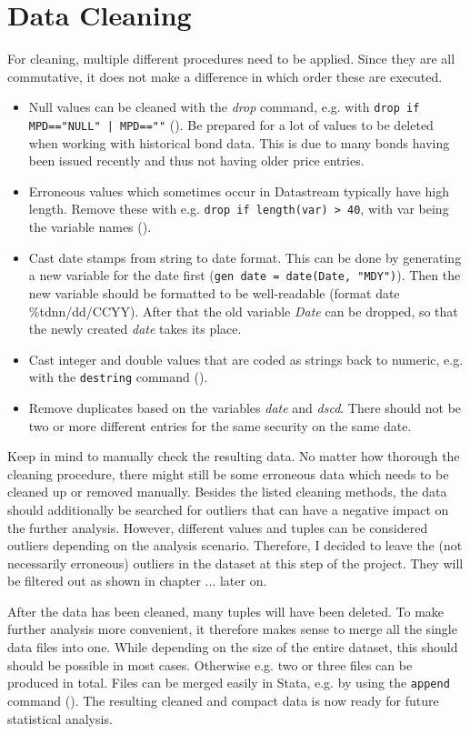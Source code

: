 \section{Data Cleaning}
For cleaning, multiple different procedures need to be applied. Since they are all commutative, it does not make a difference in which order these are executed. 
\begin{itemize}
	\item Null values can be cleaned with the \textit{drop} command, e.g. with \lstinline{drop if MPD=="NULL" | MPD==""} (). %
	Be prepared for a lot of values to be deleted when working with historical bond data. This is due to many bonds having been issued recently and thus not having older price entries. 
	\item Erroneous values which sometimes occur in Datastream typically have high length. Remove these with e.g. \lstinline{drop if length(var) > 40}, with var being the variable names (). %
	\item Cast date stamps from string to date format. This can be done by generating a new variable for the date first (\lstinline{gen date = date(Date, "MDY")}). Then the new variable should be formatted to be well-readable (format date \%tdnn/dd/CCYY). After that the old variable \textit{Date} can be dropped, so that the newly created \textit{date} takes its place. 
	\item Cast integer and double values that are coded as strings back to numeric, e.g. with the \lstinline{destring} command (). %
	\item Remove duplicates based on the variables \textit{date} and \textit{dscd}. There should not be two or more different entries for the same security on the same date. %
\end{itemize}
Keep in mind to manually check the resulting data. No matter how thorough the cleaning procedure, there might still be some erroneous data which needs to be cleaned up or removed manually. Besides the listed cleaning methods, the data should additionally be searched for outliers that can have a negative impact on the further analysis. However, different values and tuples can be considered outliers depending on the analysis scenario. Therefore, I decided to leave the (not necessarily erroneous) outliers in the dataset at this step of the project. They will be filtered out as shown in chapter ... later on. %

After the data has been cleaned, many tuples will have been deleted. To make further analysis more convenient, it therefore makes sense to merge all the single data files into one. While depending on the size of the entire dataset, this should should be possible in most cases. Otherwise e.g. two or three files can be produced in total. Files can be merged easily in Stata, e.g. by using the \lstinline{append} command (). %
The resulting cleaned and compact data is now ready for future statistical analysis. 